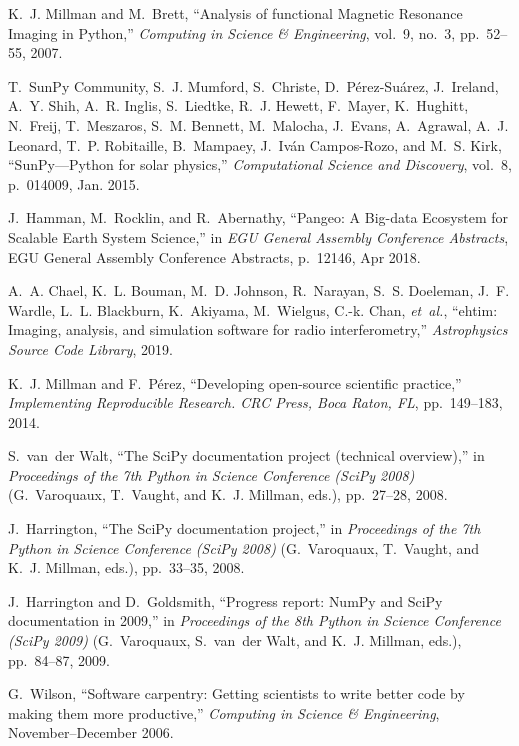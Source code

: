 \documentclass[twocolumn]{article}
\begin{document}
\begin{thebibliography}{10}
K.~J. Millman and M.~Brett, ``Analysis of functional {M}agnetic {R}esonance
  {I}maging in {P}ython,'' {\em Computing in Science \& Engineering}, vol.~9,
  no.~3, pp.~52--55, 2007.

T.~{SunPy Community}, S.~J. {Mumford}, S.~{Christe}, D.~{P{\'e}rez-Su{\'a}rez},
  J.~{Ireland}, A.~Y. {Shih}, A.~R. {Inglis}, S.~{Liedtke}, R.~J. {Hewett},
  F.~{Mayer}, K.~{Hughitt}, N.~{Freij}, T.~{Meszaros}, S.~M. {Bennett},
  M.~{Malocha}, J.~{Evans}, A.~{Agrawal}, A.~J. {Leonard}, T.~P. {Robitaille},
  B.~{Mampaey}, J.~{Iv{\'a}n Campos-Rozo}, and M.~S. {Kirk}, ``{SunPy---Python
  for solar physics},'' {\em Computational Science and Discovery}, vol.~8,
  p.~014009, Jan. 2015.

J.~{Hamman}, M.~{Rocklin}, and R.~{Abernathy}, ``{Pangeo: A Big-data Ecosystem
  for Scalable Earth System Science},'' in {\em EGU General Assembly Conference
  Abstracts}, EGU General Assembly Conference Abstracts, p.~12146, Apr 2018.

A.~A. Chael, K.~L. Bouman, M.~D. Johnson, R.~Narayan, S.~S. Doeleman, J.~F.
  Wardle, L.~L. Blackburn, K.~Akiyama, M.~Wielgus, C.-k. Chan, {\em et~al.},
  ``ehtim: Imaging, analysis, and simulation software for radio
  interferometry,'' {\em Astrophysics Source Code Library}, 2019.

K.~J. Millman and F.~P{\'e}rez, ``Developing open-source scientific practice,''
  {\em Implementing Reproducible Research. CRC Press, Boca Raton, FL},
  pp.~149--183, 2014.

S.~van~der Walt, ``The {SciPy} documentation project (technical overview),'' in
  {\em Proceedings of the 7th {P}ython in Science Conference (SciPy 2008)}
  (G.~Varoquaux, T.~Vaught, and K.~J. Millman, eds.), pp.~27--28, 2008.

J.~Harrington, ``The {SciPy} documentation project,'' in {\em Proceedings of
  the 7th {P}ython in Science Conference (SciPy 2008)} (G.~Varoquaux,
  T.~Vaught, and K.~J. Millman, eds.), pp.~33--35, 2008.

J.~Harrington and D.~Goldsmith, ``Progress report: {NumPy} and {SciPy}
  documentation in 2009,'' in {\em Proceedings of the 8th {P}ython in Science
  Conference (SciPy 2009)} (G.~Varoquaux, S.~van~der Walt, and K.~J. Millman,
  eds.), pp.~84--87, 2009.

G.~Wilson, ``Software carpentry: Getting scientists to write better code by
  making them more productive,'' {\em Computing in Science \& Engineering},
  November--December 2006.


\end{thebibliography}
\end{document}
